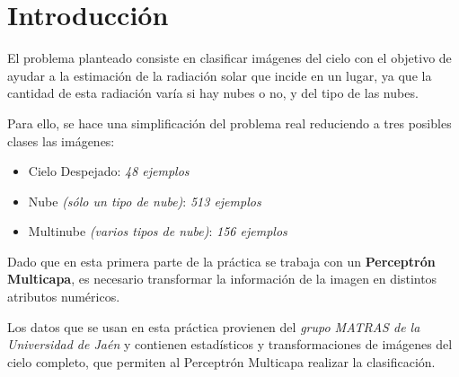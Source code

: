 \documentclass{uc3mpracticas}
\begin{document}
  \frontmatter



  \vspace{55mm}


  \newpage

  \tableofcontents

  \newpage

  \mainmatter

\section{Introducción}

El problema planteado consiste en clasificar imágenes del cielo con el objetivo de ayudar a la estimación de la radiación solar que incide en un lugar, ya que la cantidad de esta radiación varía si hay nubes o no, y del tipo de las nubes.

\vspace{3mm}

Para ello, se hace una simplificación del problema real reduciendo a tres posibles clases las imágenes:

\begin{itemize}
  \item Cielo Despejado: \textit{48 ejemplos}
  \item Nube \textit{(sólo un tipo de nube)}: \textit{513 ejemplos}
  \item Multinube \textit{(varios tipos de nube)}: \textit{156 ejemplos}
\end{itemize}

Dado que en esta primera parte de la práctica se trabaja con un \textbf{Perceptrón Multicapa}, es necesario transformar la información de la imagen en distintos atributos numéricos.

\vspace{3mm}

Los datos que se usan en esta práctica provienen del \textit{grupo MATRAS de la Universidad de Jaén} y contienen estadísticos y transformaciones de imágenes del cielo completo, que permiten al Perceptrón Multicapa realizar la clasificación.
\end{document}
